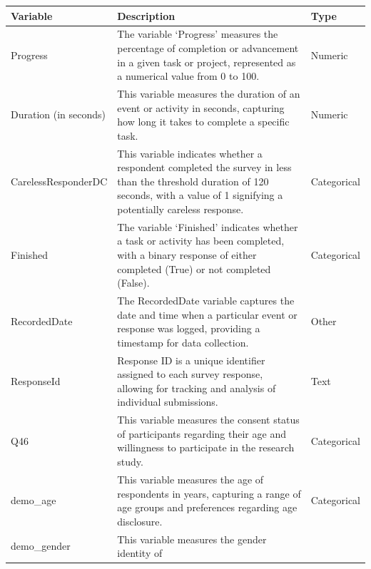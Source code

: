 \documentclass[
  man,
  longtable,
  nolmodern,
  notxfonts,
  notimes,
  colorlinks=true,linkcolor=blue,citecolor=blue,urlcolor=blue]{apa7}
\begin{document}
\begin{longtable}[]{@{}
  >{\raggedright\arraybackslash}p{}
  >{\raggedright\arraybackslash}p{}
  >{\raggedright\arraybackslash}p{}@{}}
\toprule\noalign{}
\begin{minipage}[b]{\linewidth}\raggedright
Variable
\end{minipage} & \begin{minipage}[b]{\linewidth}\raggedright
Description
\end{minipage} & \begin{minipage}[b]{\linewidth}\raggedright
Type
\end{minipage} \\
\midrule\noalign{}
\endhead
\bottomrule\noalign{}
\endlastfoot
Progress & The variable `Progress' measures the percentage of completion
or advancement in a given task or project, represented as a numerical
value from 0 to 100. & Numeric \\
Duration (in seconds) & This variable measures the duration of an event
or activity in seconds, capturing how long it takes to complete a
specific task. & Numeric \\
CarelessResponderDC & This variable indicates whether a respondent
completed the survey in less than the threshold duration of 120 seconds,
with a value of 1 signifying a potentially careless response. &
Categorical \\
Finished & The variable `Finished' indicates whether a task or activity
has been completed, with a binary response of either completed (True) or
not completed (False). & Categorical \\
RecordedDate & The RecordedDate variable captures the date and time when
a particular event or response was logged, providing a timestamp for
data collection. & Other \\
ResponseId & Response ID is a unique identifier assigned to each survey
response, allowing for tracking and analysis of individual submissions.
& Text \\
Q46 & This variable measures the consent status of participants
regarding their age and willingness to participate in the research
study. & Categorical \\
demo\_age & This variable measures the age of respondents in years,
capturing a range of age groups and preferences regarding age
disclosure. & Categorical \\
demo\_gender & This variable measures the gender identity of

\end{longtable}
\end{document}
